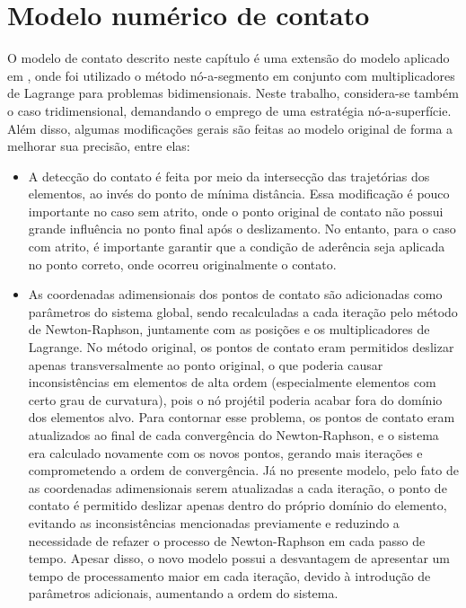 \documentclass[Tese.tex]{subfiles}
\begin{document}
	
\chapter{Modelo numérico de contato}\label{ch:contato}

O modelo de contato descrito neste capítulo é uma extensão do modelo aplicado em , onde foi utilizado o método nó-a-segmento em conjunto com multiplicadores de Lagrange para problemas bidimensionais. Neste trabalho, considera-se também o caso tridimensional, demandando o emprego de uma estratégia nó-a-superfície. Além disso, algumas modificações gerais são feitas ao modelo original de forma a melhorar sua precisão, entre elas:
\begin{itemize}[itemsep=-0.8ex]
	\item A detecção do contato é feita por meio da intersecção das trajetórias dos elementos, ao invés do ponto de mínima distância. Essa modificação é pouco importante no caso sem atrito, onde o ponto original de contato não possui grande influência no ponto final após o deslizamento. No entanto, para o caso com atrito, é importante garantir que a condição de aderência seja aplicada no ponto correto, onde ocorreu originalmente o contato.
	\item As coordenadas adimensionais dos pontos de contato são adicionadas como parâmetros do sistema global, sendo recalculadas a cada iteração pelo método de Newton-Raphson, juntamente com as posições e os multiplicadores de Lagrange. No método original, os pontos de contato eram permitidos deslizar apenas transversalmente ao ponto original, o que poderia causar inconsistências em elementos de alta ordem (especialmente elementos com certo grau de curvatura), pois o nó projétil poderia acabar fora do domínio dos elementos alvo. Para contornar esse problema, os pontos de contato eram atualizados ao final de cada convergência do Newton-Raphson, e o sistema era calculado novamente com os novos pontos, gerando mais iterações e comprometendo a ordem de convergência. Já no presente modelo, pelo fato de as coordenadas adimensionais serem atualizadas a cada iteração, o ponto de contato é permitido deslizar apenas dentro do próprio domínio do elemento, evitando as inconsistências mencionadas previamente e reduzindo a necessidade de refazer o processo de Newton-Raphson em cada passo de tempo. Apesar disso, o novo modelo possui a desvantagem de apresentar um tempo de processamento maior em cada iteração, devido à introdução de parâmetros adicionais, aumentando a ordem do sistema.
\end{itemize}
\end{document}
